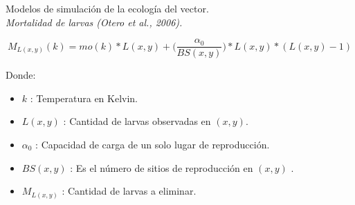 {
\begin{frame}[c]{Modelos de simulación de la ecología del vector.\\\textit{Mortalidad de larvas (Otero et al., 2006).}}
  \begin{center}
      \begin{equation}
      M_{L(x,y)}(k) = mo(k) * L(x,y) + \bigg(\frac{\alpha _{0}}{BS(x,y)}\bigg) * L(x,y) *(L(x,y) - 1)
    \end{equation}
  \end{center}
  Donde:
 \begin{itemize}
      \item $k$ : Temperatura en Kelvin.
      \item $L(x, y)$ : Cantidad de larvas observadas en $(x,y)$.
      \item $\alpha _{0}$ : Capacidad de carga de un solo lugar de reproducción.
      \item $BS(x,y)$ : Es el número de sitios de reproducción en $(x,y)$ .
      \item $M_{L(x,y)}$ : Cantidad de larvas a eliminar.
    \end{itemize}
\end{frame}
}


